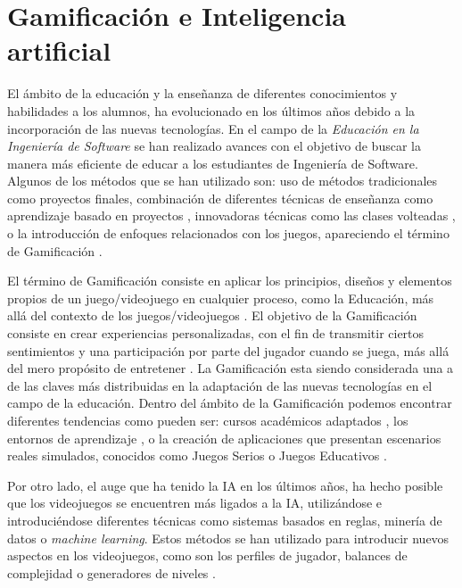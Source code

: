 \section{Gamificación e Inteligencia artificial}
\label{sec:Gamificacion}
El ámbito de la educación y la enseñanza de diferentes conocimientos y habilidades a los alumnos, ha evolucionado en los últimos años debido a la incorporación de las nuevas tecnologías. En el campo de la \emph{Educación en la Ingeniería de Software} se han realizado avances con el objetivo de buscar la manera más eficiente de educar a los estudiantes de Ingeniería de Software. Algunos de los métodos que se han utilizado son: uso de métodos tradicionales como proyectos finales, combinación de diferentes técnicas de enseñanza como aprendizaje basado en proyectos \cite{alabbadi2016proposed}, innovadoras técnicas como las clases volteadas \cite{choi2013applying}, o la introducción de enfoques relacionados con los juegos, apareciendo el término de Gamificación \cite{connolly2007application}.

El término de Gamificación consiste en aplicar los principios, diseños y elementos propios de un juego/videojuego en cualquier proceso, como la Educación, más allá del contexto de los juegos/videojuegos \cite{gallego2014panoramica}. El objetivo de la Gamificación consiste en crear experiencias personalizadas, con el fin de transmitir ciertos sentimientos y una participación por parte del jugador cuando se juega, más allá del mero propósito de entretener \cite{alhammad2018gamification}. La Gamificación esta siendo considerada una a de las claves más distribuidas en la adaptación de las nuevas tecnologías en el campo de la educación. Dentro del ámbito de la Gamificación podemos encontrar diferentes tendencias como pueden ser: cursos académicos adaptados \cite{murphy2008distance}, los entornos de aprendizaje \cite{burnell2002teaching}, o la creación de aplicaciones que presentan escenarios reales simulados, conocidos como Juegos Serios o Juegos Educativos \cite{meneely2009preparing}.

Por otro lado, el auge que ha tenido la IA en los últimos años, ha hecho posible que los videojuegos se encuentren más ligados a la IA, utilizándose e introduciéndose diferentes técnicas como sistemas basados en reglas, minería de datos o \emph{machine learning}. Estos métodos se han utilizado para introducir nuevos aspectos en los videojuegos, como son los perfiles de jugador, balances de complejidad o generadores de niveles \cite{westera2020artificial}.

